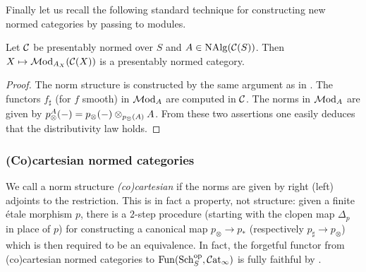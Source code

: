 \documentclass{amsart}
\numberwithin{proposition}{section}
\numberwithin{equation}{section}
\begin{document}
Finally let us recall the following standard technique for constructing new normed categories by passing to modules.
\begin{lemma}
Let $\mathcal C$ be presentably normed over $S$ and $A \in \mathrm{NAlg}(\mathcal C(S))$.
Then $X \mapsto \mathcal{M}\mathrm{od}_{A_X}(\mathcal C(X))$ is a presentably normed category.
\end{lemma}
\begin{proof}
The norm structure is constructed by the same argument as in \cite[Proposition 7.6(4)]{bachmann-norms}.
The functors $f_\sharp$ (for $f$ smooth) in $\mathcal{M}\mathrm{od}_A$ are computed in $\mathcal C$.
The norms in $\mathcal{M}\mathrm{od}_A$ are given by $p_\otimes^A(\mathord-) = p_\otimes(\mathord-) \otimes_{p_\otimes(A)}A$.
From these two assertions one easily deduces that the distributivity law holds.
\end{proof}

\subsubsection{(Co)cartesian normed categories} \label{subsub:cocart-normed}
We call a norm structure \emph{(co)cartesian} if the norms are given by right (left) adjoints to the restriction.
This is in fact a property, not structure: given a finite étale morphism $p$, there is a $2$-step procedure (starting with the clopen map $\Delta_p$ in place of $p$) for constructing a canonical map $p_\otimes \to p_*$ (respectively $p_\sharp \to p_\otimes$) which is then required to be an equivalence.
In fact, the forgetful functor from (co)cartesian normed categories to $\mathrm{Fun}(\mathrm{S}\mathrm{ch}{}_S^{\mathrm{op}}, \mathcal{C}\mathrm{at}{}_\infty)$ is fully faithful by \cite[Theorem 3.3]{dauser2024uniqueness}.
\end{document}
